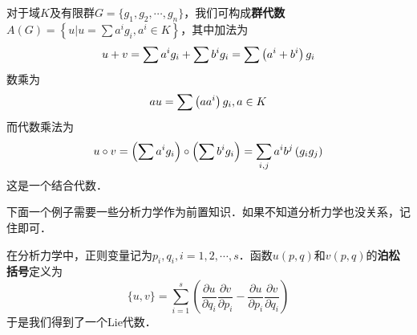 \begin{example}{}
对于域$K $及有限群$G=\{g_1,g_2,\cdots,g_n\}$，我们可构成\textbf{群代数}$\displaystyle A(G)=\left\{u | u=\sum a^{i} g_{i}, a^{i} \in K\right\}$，其中加法为
\begin{equation}
u+v=\sum a^{i} g_{i}+\sum b^{i} g_{i}=\sum\left(a^{i}+b^{i}\right) g_{i} \notag
\end{equation}
数乘为
\begin{equation}
a u=\sum\left(a a^{i}\right) g_{i}, a \in K \notag
\end{equation}
而代数乘法为
\begin{equation}
u \circ v=\left(\sum a^{i} g_{i}\right) \circ\left(\sum b^{i} g_{i}\right)=\sum_{i, j} a^{i} b^{j}\left(g_{i} g_{j}\right) \notag
\end{equation}
这是一个结合代数．
\end{example}

下面一个例子需要一些分析力学作为前置知识．如果不知道分析力学也没关系，记住即可．
\begin{example}{}
在分析力学中，正则变量记为$p_i,q_i, i=1,2,\cdots, s$．函数$u(p,q)$和$v(p, q)$的\textbf{泊松括号}定义为\begin{equation}
\{u, v\}=\sum_{i=1}^{s}\left(\frac{\partial u}{\partial q_{i}} \frac{\partial v}{\partial p_{i}}-\frac{\partial u}{\partial p_{i}} \frac{\partial v}{\partial q_{i}}\right)
\end{equation}
于是我们得到了一个Lie代数．
\end{example}

